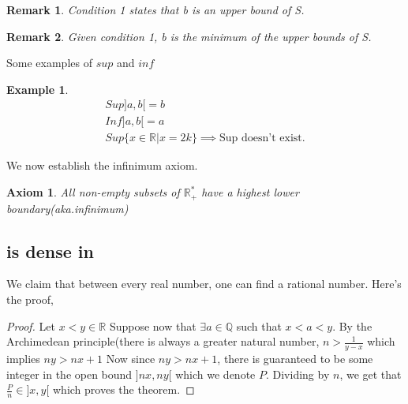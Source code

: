 \documentclass{article}
\newtheorem{remark}{Remark}
\newtheorem{example}{Example}[section]
\newtheorem{axiom}{Axiom}
\begin{document}
\begin{remark}
    Condition 1 states that b is an upper bound of S. 
 
\end{remark}


\begin{remark}
       Given condition 1, b is the \textit{minimum} of the upper bounds of S.
\end{remark}
    
Some examples of $sup$ and $inf$

\begin{example}
\begin{align*}
 Sup ]a,b[ = b\\
 Inf ]a,b[ = a\\
 Sup \{ x\in \mathbb{R} \vert x = 2k\} \implies \text{Sup doesn't exist.}
\end{align*}
\end{example}


We now establish the infinimum axiom.
\begin{axiom}
All non-empty subsets of $\mathbb{R}_{+}^{*}$ have a highest lower boundary(aka.infinimum)
\end{axiom}

\subsection{ is dense in }
We claim that between every real number, one can find a rational number. Here's the proof,

\begin{tcolorbox}
\begin{proof}
    Let $x<y \in \mathbb{R}$ Suppose now that $\exists a \in \mathbb{Q}$ such that $x<a<y$. By the Archimedean principle(there is always a greater natural number, $n > \frac{1}{y-x}$ which implies $ny>nx+1$ Now since $ny>nx+1$, there is guaranteed to be some integer in the open bound $]nx,ny[$ which we denote $P$. Dividing by $n$, we get that $\frac{P}{n} \in ]x,y[$ which proves the theorem. 
    \tag*{\qedhere}
\end{proof}
\end{tcolorbox}
\end{document}

